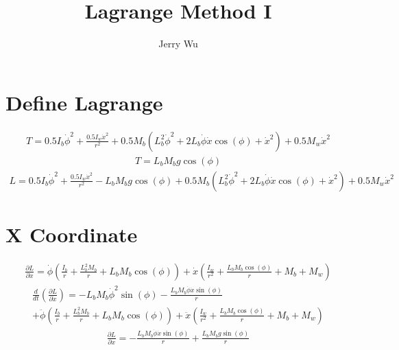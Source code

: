 \documentclass[12pt]{article}
\begin{document}
\title{\Huge Lagrange Method I}
\author{Jerry Wu}
\date{}
\maketitle

\section*{Define Lagrange}
\begin{multline*}
T= 0.5 I_{b} \dot{\phi}^{2} + \frac{0.5 I_{w} \dot{x}^{2}}{r^{2}} + 0.5 M_{b} \left(L_{b}^{2} \dot{\phi}^{2} + 2 L_{b} \dot{\phi} \dot{x} \cos{\left(\phi \right)} + \dot{x}^{2}\right) + 0.5 M_{w} \dot{x}^{2}
\end{multline*}
\begin{multline*}
T= L_{b} M_{b} g \cos{\left(\phi \right)}
\end{multline*}
\begin{multline*}
L= 0.5 I_{b} \dot{\phi}^{2} + \frac{0.5 I_{w} \dot{x}^{2}}{r^{2}} - L_{b} M_{b} g \cos{\left(\phi \right)} + 0.5 M_{b} \left(L_{b}^{2} \dot{\phi}^{2} + 2 L_{b} \dot{\phi} \dot{x} \cos{\left(\phi \right)} + \dot{x}^{2}\right) + 0.5 M_{w} \dot{x}^{2}
\end{multline*}

\section*{X Coordinate}
\begin{multline*}
\frac{\partial L}{\partial \dot{x}}= \dot{\phi} \left(\frac{I_{b}}{r} + \frac{L_{b}^{2} M_{b}}{r} + L_{b} M_{b} \cos{\left(\phi \right)}\right) + \dot{x} \left(\frac{I_{w}}{r^{2}} + \frac{L_{b} M_{b} \cos{\left(\phi \right)}}{r} + M_{b} + M_{w}\right)
\end{multline*}
\begin{multline*}
\frac{d}{dt}(\frac{\partial L}{\partial \dot{x}})= - L_{b} M_{b} \dot{\phi}^{2} \sin{\left(\phi \right)} - \frac{L_{b} M_{b} \dot{\phi} \dot{x} \sin{\left(\phi \right)}}{r} \\
+ \ddot{\phi} \left(\frac{I_{b}}{r} + \frac{L_{b}^{2} M_{b}}{r} + L_{b} M_{b} \cos{\left(\phi \right)}\right) + \ddot{x} \left(\frac{I_{w}}{r^{2}} + \frac{L_{b} M_{b} \cos{\left(\phi \right)}}{r} + M_{b} + M_{w}\right)
\end{multline*}
\begin{multline*}
\frac{\partial L}{\partial x}= - \frac{L_{b} M_{b} \dot{\phi} \dot{x} \sin{\left(\phi \right)}}{r} + \frac{L_{b} M_{b} g \sin{\left(\phi \right)}}{r}
\end{multline*}
\end{document}
